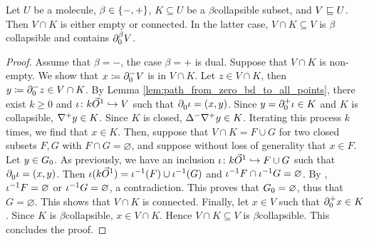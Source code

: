 \begin{lem} \label{lem:collapsible_connected_with_all_closure_element}
    Let \( U \) be a molecule, \( \beta \in \set{-, +} \), \( K \subseteq U \) be a \( \beta \)\nbd collapsible subset, and \( V \submol U \).
    Then \( V \cap K \) is either empty or connected.
    In the latter case, \( V \cap K \subseteq V \) is \( \beta \)\nbd collapsible and contains \( \bd{0}{\beta} V \).
\end{lem}
\begin{proof}
    Assume that \( \beta = - \), the case \( \beta = + \) is dual.
    Suppose that \( V \cap K \) is non-empty.
    We show that \( x \eqdef \bd{0}{-} V \) is in \( V \cap K \).
    Let \( z \in V \cap K \), then \( y \eqdef \bd{0}{-} z \in V \cap K \).
    By Lemma \ref{lem:path_from_zero_bd_to_all_points}, there exist \( k \geq 0 \) and \( \iota \colon k\arr \incl V \) such that \( \bd{0}{} \iota = (x, y) \).
    Since \( y = \bd{0}{+} \iota \in K \) and \( K \) is collapsible, \( \cofaces{}{+} y \in K \).
    Since \( K \) is closed, \( \faces{}{-} \cofaces{}{+} y \in K \).
    Iterating this process \( k \) times, we find that \( x \in K \).
    Then, suppose that \( V \cap K = F \cup G \) for two closed subsets \( F, G \) with \( F \cap G = \varnothing \), and suppose without loss of generality that \( x \in F \).
    Let \( y \in \gr{0}{G} \). 
    As previously, we have an inclusion \( \iota \colon k\arr \incl F \cup G \) such that \( \bd{0}{}\iota = (x, y) \).
    Then \( \iota(k\arr) = \invrs{\iota}(F) \cup \invrs{\iota}(G) \) and \( \invrs{\iota}F \cap \invrs{\iota}G = \varnothing \).
    By \cite[Lemma 3.3.13]{hadzihasanovic2024combinatorics}, \( \invrs{\iota}F = \varnothing \) or \( \invrs{\iota}G = \varnothing \), a contradiction.
    This proves that \(  \gr{0}{G} = \varnothing \), thus that \( G = \varnothing \).
    This shows that \( V \cap K \) is connected.
    Finally, let \( x \in V \) such that \( \bd{0}{+} x \in K \).
    Since \( K \) is  \( \beta \)\nbd collapsible, \( x \in V \cap K \).
    Hence \( V \cap K \subseteq V \) is \( \beta \)\nbd collapsible.
    This concludes the proof.
\end{proof}

